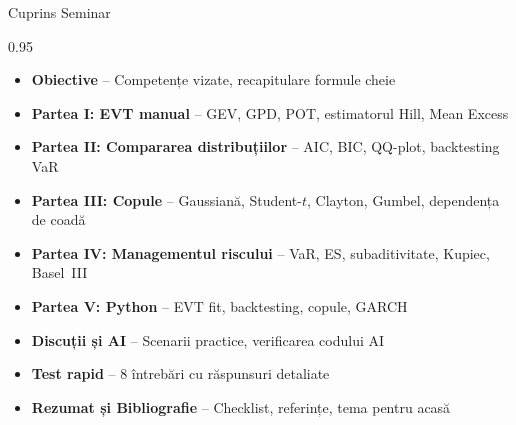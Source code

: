\documentclass[9pt, aspectratio=169, t]{beamer}
\subtitle{Seminar 4: EVT, Copule și Managementul Riscului}
\begin{document}
{
\begin{frame}
    \titlepage
\end{frame}
}

\begin{frame}{Cuprins Seminar}
    \begin{cminipage}{0.95\textwidth}
    \begin{itemize}\setlength{\itemsep}{0pt}
        \item \textbf{Obiective} -- Competențe vizate, recapitulare formule cheie
        \vspace{0.1cm}
        \item \textbf{Partea I: EVT manual} -- GEV, GPD, POT, estimatorul Hill, Mean Excess
        \vspace{0.1cm}
        \item \textbf{Partea II: Compararea distribuțiilor} -- AIC, BIC, QQ-plot, backtesting VaR
        \vspace{0.1cm}
        \item \textbf{Partea III: Copule} -- Gaussiană, Student-$t$, Clayton, Gumbel, dependența de coadă
        \vspace{0.1cm}
        \item \textbf{Partea IV: Managementul riscului} -- VaR, ES, subaditivitate, Kupiec, Basel~III
        \vspace{0.1cm}
        \item \textbf{Partea V: Python} -- EVT fit, backtesting, copule, GARCH
        \vspace{0.1cm}
        \item \textbf{Discuții și AI} -- Scenarii practice, verificarea codului AI
        \vspace{0.1cm}
        \item \textbf{Test rapid} -- 8 întrebări cu răspunsuri detaliate
        \vspace{0.1cm}
        \item \textbf{Rezumat și Bibliografie} -- Checklist, referințe, tema pentru acasă
    \end{itemize}
    \end{cminipage}
\end{frame}
\end{document}
